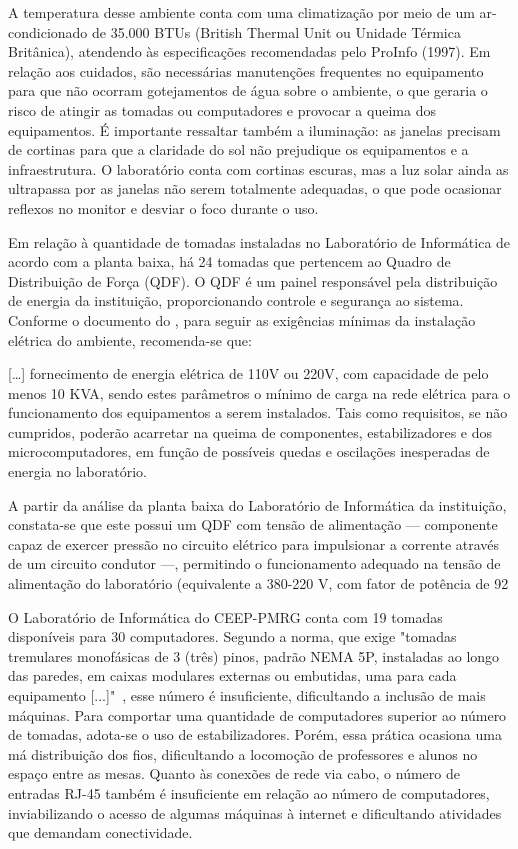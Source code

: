 \documentclass[12pt, openright, oneside, a4paper, brazil]{abntex2}
\begin{document}
	A temperatura desse ambiente conta com uma climatização por meio de um ar-condicionado de 35.000 BTUs (British Thermal Unit ou Unidade Térmica Britânica), atendendo às especificações recomendadas pelo ProInfo (1997). Em relação aos cuidados, são necessárias manutenções frequentes no equipamento para que não ocorram gotejamentos de água sobre o ambiente, o que geraria o risco de atingir as tomadas ou computadores e provocar a queima dos equipamentos. É importante ressaltar também a iluminação: as janelas precisam de cortinas para que a claridade do sol não prejudique os equipamentos e a infraestrutura. O laboratório conta com cortinas escuras, mas a luz solar ainda as ultrapassa por as janelas não serem totalmente adequadas, o que pode ocasionar reflexos no monitor e desviar o foco durante o uso.

	Em relação à quantidade de tomadas instaladas no Laboratório de Informática de acordo com a planta baixa, há 24 tomadas que pertencem ao Quadro de Distribuição de Força (QDF). O QDF é um painel responsável pela distribuição de energia da instituição, proporcionando controle e segurança ao sistema. Conforme o documento do , para seguir as exigências mínimas da instalação elétrica do ambiente, recomenda-se que:

\begin{citacao}
		{[\dots]} fornecimento de energia elétrica de 110V ou 220V, com capacidade de pelo menos 10 KVA, sendo estes parâmetros o mínimo de carga na rede elétrica para o funcionamento dos equipamentos a serem instalados. Tais como requisitos, se não cumpridos, poderão acarretar na queima de componentes, estabilizadores e dos microcomputadores, em função de possíveis quedas e oscilações inesperadas de energia no laboratório.
\end{citacao}

	A partir da análise da planta baixa do Laboratório de Informática da instituição, constata-se que este possui um QDF com tensão de alimentação — componente capaz de exercer pressão no circuito elétrico para impulsionar a corrente através de um circuito condutor —, permitindo o funcionamento adequado na tensão de alimentação do laboratório (equivalente a 380-220 V, com fator de potência de 92%

	O Laboratório de Informática do CEEP-PMRG conta com 19 tomadas disponíveis para 30 computadores. Segundo a norma, que exige "tomadas tremulares monofásicas de 3 (três) pinos, padrão NEMA 5P, instaladas ao longo das paredes, em caixas modulares externas ou embutidas, uma para cada equipamento [...]"~, esse número é insuficiente, dificultando a inclusão de mais máquinas. Para comportar uma quantidade de computadores superior ao número de tomadas, adota-se o uso de estabilizadores. Porém, essa prática ocasiona uma má distribuição dos fios, dificultando a locomoção de professores e alunos no espaço entre as mesas. Quanto às conexões de rede via cabo, o número de entradas RJ-45 também é insuficiente em relação ao número de computadores, inviabilizando o acesso de algumas máquinas à internet e dificultando atividades que demandam conectividade.
\end{document}
